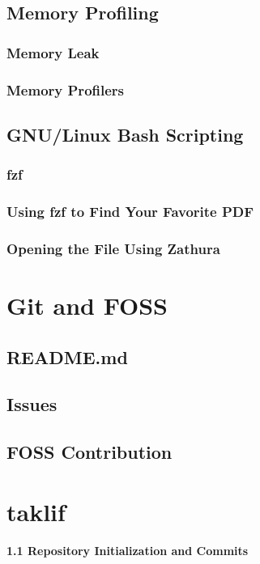 \documentclass{article}
\begin{document}
\subsection{Memory Profiling}
\subsubsection{Memory Leak}
\subsubsection{Memory Profilers}
\subsection{GNU/Linux Bash Scripting}
\subsubsection{fzf}
\subsubsection{Using fzf to Find Your Favorite PDF}
\subsubsection{Opening the File Using Zathura}

\section{Git and FOSS}
\subsection{README.md}
\subsection{Issues}
\subsection{FOSS Contribution}










\section*{taklif}

\textbf{1.1 Repository Initialization and Commits}
\end{document}

